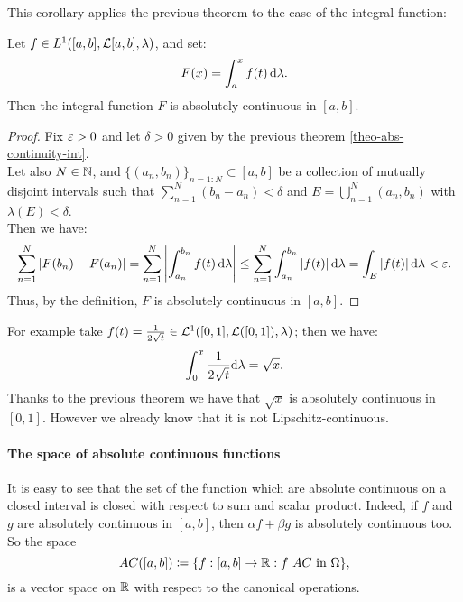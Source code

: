This corollary applies the previous theorem to the case of the integral function:
\begin{coro} \label{absolute-continuity-integral}
	Let $f\in L^1 ([a,b], \mathcal L[a,b],\lambda)$, and set:
	$$F(x) = \int_a^x f(t) \,\mathrm d \lambda.$$
	Then the integral function $F$ is absolutely continuous in $[a,b]$.
\end{coro}
\begin{proof}
	Fix $\varepsilon> 0$ and let $\delta > 0 $ given by the previous theorem \vref{theo-abs-continuity-int}. \\
	Let also $N\in\mathbb N$, and $\{(a_n,b_n)\}_{n=1:N }\subset [a,b]$ be a collection of mutually disjoint intervals such that $\sum_{n=1}^{N}(b_n-a_n)< \delta$ and $E=\bigcup_{n=1}^{N} (a_n,b_n)$ with $\lambda(E)<\delta$.\\
	Then we have:
	$$\sum_{n=1}^N |F(b_n)-F(a_n)| 
	= \sum_{n=1}^N \left| \int_{a_n}^{b_n} f(t) \,\mathrm d \lambda \right|
	\leq \sum_{n=1}^N \int_{a_n}^{b_n}|f(t)| \,\mathrm d \lambda
	= \int_E |f(t)| \,\mathrm d \lambda < \varepsilon.$$
	Thus, by the definition, $F$ is absolutely continuous in $[a,b]$.
\end{proof}

For example take $f(t)= \frac 1 {2\sqrt{t}}\in \mathcal L^1([0,1],\mathcal L([0,1]),\lambda)$; then we have:
$$ \int_0^x \frac 1 {2\sqrt{t}} \mathrm d \lambda = \sqrt{x}.$$
Thanks to the previous theorem we have that $\sqrt{x}$ is absolutely continuous in $[0,1]$. However we already know that it is not Lipschitz-continuous.

\paragraph{The space of absolute continuous functions} It is easy to see that the set of the function which are absolute continuous on a closed interval is closed with respect to sum and scalar product. Indeed, if $f$ and $g$ are absolutely continuous in $[a,b]$, then $\alpha f + \beta g$ is absolutely continuous too. So the space $$AC([a,b])\coloneqq \{f:[a,b] \to \RR : f  \ AC\text{ in } \Omega\},$$ is a vector space on $\mathbb R$ with respect to the canonical operations.

